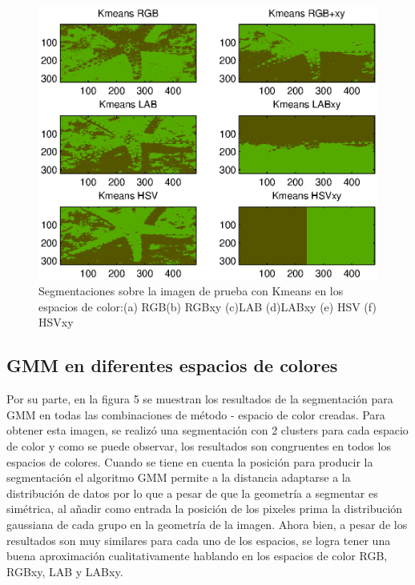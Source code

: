 \documentclass[10pt,twocolumn,letterpaper]{article}
\begin{document}
\begin{figure}[t]
\begin{center}
   \includegraphics[width=1\linewidth]{seg_colorspace.eps}
\end{center}
   \caption{Segmentaciones sobre la imagen de prueba con Kmeans en los espacios de color:(a) RGB(b) RGBxy (c)LAB (d)LABxy (e) HSV (f) HSVxy }
\label{fig:seg}
\end{figure}

\subsection{GMM en diferentes espacios de colores}

Por su parte, en la figura 5 se muestran los resultados de la segmentación para GMM en todas las combinaciones de método - espacio de color creadas. Para obtener esta imagen, se realizó una segmentación con 2 clusters para cada espacio de color y como se puede observar, los resultados son congruentes en todos los espacios de colores. Cuando se tiene en cuenta la posición para producir la segmentación el algoritmo GMM permite a la distancia adaptarse a la distribución de datos por lo que a pesar de que la geometría a segmentar es simétrica, al añadir como entrada la posición de los pixeles prima la distribución gaussiana de cada grupo en la geometría de la imagen. Ahora bien, a pesar de los resultados son muy similares para cada uno de los espacios, se logra tener una buena aproximación cualitativamente hablando en los espacios de color RGB, RGBxy, LAB y LABxy.
\end{document}
